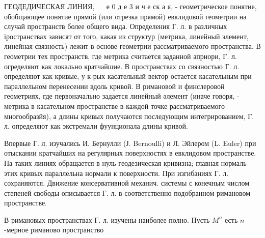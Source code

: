 \documentclass[10pt]{article}
\begin{document}
ГЕОДЕДИЧЕСКАЯ ЛИНИЯ, $\quad$ е 0 д е 3 и ч е ск а я, - геометрическое понятие, обобщающее понятие прямой (или отрезка прямой) евклидовой геометрии на случай пространств более общего вида. Определения Г. л. в различных іространствах зависят от того, какая из структур (метрика, линейный элемент, линейная связность) лежит в основе геометрии рассматриваемого пространства. В геометрии тех пространств, где метрика считается заданной априори, Г. л. огределяют как локально кратчайшие. В пространствах со связностью $Г$. л. определяют как кривые, у к-рых касательный вектор остается касательным при параллельном перенесении вдоль кривой. В римановой и финслеровой геометриях, где первоначально задается линейный әлемент (иначе говоря, - метрика в касательном пространстве в каждой точке рассматриваемого многообразйя), а длины кривых получаются последующим интегрированием, Г. л. определяют как экстремали фуунционала длины кривой.



Впервые Г. л. изучались И. Бернулли (Ј. Bernoulli) и Л. Эйлером (L. Euler) при отыскании кратчайших на регулярных поверхностях в евклидовом пространстве. На таких линиях обращается в нуль геодезическая кривизна; главная нормаль этих кривых параллельна нормали к поверхности. При изгибаниях Г. л. сохраняются. Движение консервативной механич. системы с конечным числом степеней свободы описывается Г. л. в соответственно подобранном римановом пространстве.



В римановых пространствах Г. л. изучены наиболее полно. Пусть $M^{n}$ есть $n$-мерное риманово пространство
\end{document}
